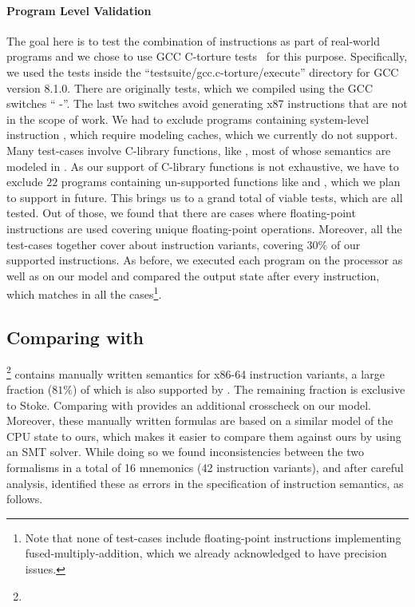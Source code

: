 \paragraph{Program Level Validation}

The goal here is to test the combination of instructions as part of real-world programs and we chose to use GCC C-torture tests~\cite{CTORTURE} for this purpose. Specifically, we used the tests inside the ``testsuite/gcc.c-torture/execute'' directory for GCC version 8.1.0.  
There are originally \TortureTotal{} tests, which we compiled using the GCC switches ``     -''. The last two switches avoid generating x87 instructions that are not in the scope of work. We had to exclude \TortureExclude{} programs containing system-level instruction , which require modeling caches, which we currently do not support. Many test-cases involve C-library functions, like , most of whose semantics are modeled in \K. As our support of C-library functions is not exhaustive, we have to exclude $22$ programs containing un-supported functions like  and , which we plan to support in future. This brings us to a grand total of \TortureInclude{} viable tests, which are all tested. Out of those, we found that there are \TortureUifsInstr{} cases where floating-point instructions are used covering \TortureUifs{} unique floating-point operations. Moreover, all the test-cases together cover about \TortureCoverage{} instruction variants, covering  $30\%$ of our supported instructions. As before, we executed each program on the processor as well as  on our model and compared the output state after every instruction, which matches in all the cases\footnote{Note that none of test-cases include floating-point instructions implementing fused-multiply-addition, which we already acknowledged to have precision issues.}. 


\subsection{Comparing with \Stoke}\label{subsec:compare-stoke}
\footnote{} contains manually written semantics for \stokeIS{} x86-64 instruction variants, a large fraction ($81\%$) of which is also supported by \Strata. The remaining fraction is exclusive to Stoke. Comparing with \Stoke provides an additional crosscheck on our model.  Moreover, these manually written formulas are based on a similar model of the CPU state to ours, which makes it easier to compare them against ours by using an SMT solver. While doing so we found inconsistencies between the two formalisms in a total of 16 mnemonics (42 instruction variants), and after careful analysis, identified these as errors in the \Stoke specification of instruction semantics, as follows.

